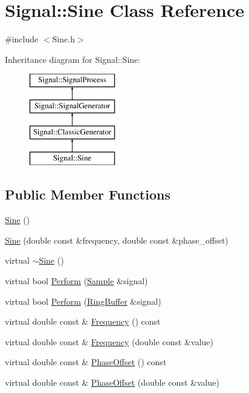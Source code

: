 \hypertarget{class_signal_1_1_sine}{\section{Signal\+:\+:Sine Class Reference}
\label{class_signal_1_1_sine}
}


{\ttfamily \#include $<$Sine.\+h$>$}

Inheritance diagram for Signal\+:\+:Sine\+:\begin{figure}[H]
\begin{center}
\leavevmode
\includegraphics[height=4.000000cm]{class_signal_1_1_sine}
\end{center}
\end{figure}
\subsection*{Public Member Functions}
\begin{DoxyCompactItemize}
\item 
\hyperlink{class_signal_1_1_sine_aa808d1e080ee1c18324eedc020ee0514}{Sine} ()
\item 
\hyperlink{class_signal_1_1_sine_a0dbdf5da8c6baeea56a70f3eb9c3a6fd}{Sine} (double const \&frequency, double const \&phase\+\_\+offset)
\item 
virtual \hyperlink{class_signal_1_1_sine_a0d6a85ad0ddea987aba1955f98be89df}{$\sim$\+Sine} ()
\item 
virtual bool \hyperlink{class_signal_1_1_sine_a8f7c74c35cfd87b490d84a7a75c35691}{Perform} (\hyperlink{class_signal_1_1_sample}{Sample} \&signal)
\item 
virtual bool \hyperlink{class_signal_1_1_sine_ac0a6c6e24f830446ea75de3a392f7e06}{Perform} (\hyperlink{class_signal_1_1_ring_buffer}{Ring\+Buffer} \&signal)
\item 
virtual double const \& \hyperlink{class_signal_1_1_signal_generator_a96af42ee68f94e9b04d034fd68b73ecd}{Frequency} () const 
\item 
virtual double const \& \hyperlink{class_signal_1_1_signal_generator_af83b532bf3ddc3637c2fd7a1dfd095cb}{Frequency} (double const \&value)
\item 
virtual double const \& \hyperlink{class_signal_1_1_signal_generator_ac2538ec946f001e394d2416fda698d1c}{Phase\+Offset} () const 
\item 
virtual double const \& \hyperlink{class_signal_1_1_signal_generator_ac6a103ff72beaa338f6d18c812522d78}{Phase\+Offset} (double const \&value)
\end{DoxyCompactItemize}
